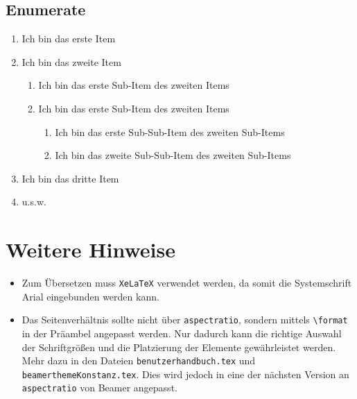 \documentclass[rgb]{beamer}
\begin{document}
\subsection{Enumerate}
\begin{frame}[t]
\subsectionpage
	\begin{enumerate}
		\item Ich bin das erste Item
		\item Ich bin das zweite Item
		\begin{enumerate}
			\item Ich bin das erste Sub-Item des zweiten Items
			\item Ich bin das erste Sub-Item des zweiten Items
			\begin{enumerate}
				\item Ich bin das erste Sub-Sub-Item des zweiten Sub-Items
				\item Ich bin das zweite Sub-Sub-Item des zweiten Sub-Items
			\end{enumerate}
		\end{enumerate}
		\item Ich bin das dritte Item
		\item u.s.w.
	\end{enumerate}
\end{frame}




\section{Weitere Hinweise}

\begin{frame}[t]
	\sectionpage
	\begin{itemize}
		\item Zum Übersetzen muss \texttt{XeLaTeX} verwendet werden, da somit die Systemschrift Arial eingebunden werden kann.
		\item Das Seitenverhältnis sollte nicht über \texttt{aspectratio}, sondern mittels \texttt{\textbackslash format} in der Präambel angepasst werden. Nur dadurch kann die richtige Auswahl der Schriftgrößen und die Platzierung der Elemente gewährleistet werden. Mehr dazu in den Dateien \texttt{benutzerhandbuch.tex} und \texttt{beamerthemeKonstanz.tex}. Dies wird jedoch in eine der nächsten Version an \texttt{aspectratio} von Beamer angepasst.	
	\end{itemize}
\end{frame}
\end{document}
